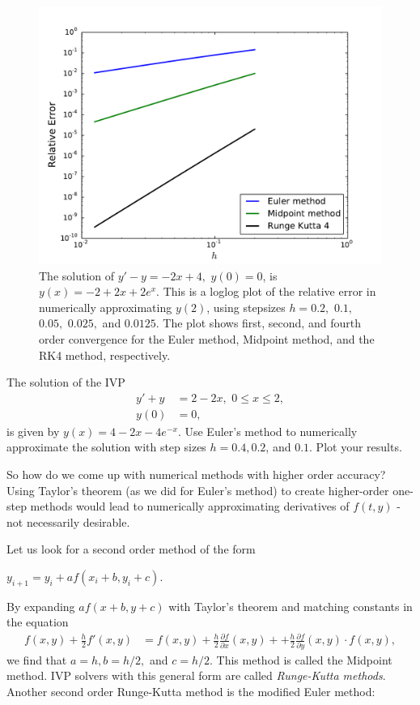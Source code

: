 \begin{figure}[ht]
\centering
\includegraphics[width=\textwidth]{Fig3.pdf}
\caption{The solution of $y' -y= -2x+4,$ $ y(0) = 0$, is $y(x) = -2+2x + 2e^x.$ This is a loglog plot of the relative error in numerically approximating $y(2)$, using stepsizes $h = 0.2,$ $0.1,$ $0.05,$ $0.025,$ and $0.0125$. The plot shows first, second, and fourth order convergence for the Euler method, Midpoint method, and the RK4 method, respectively.}
\label{ivp:relative_error}
\end{figure}


\begin{problem} The solution of the IVP
\begin{align*}
y' + y &= 2-2x,\,\, 0 \leq x \leq 2, \\
y(0) &= 0,
\end{align*}
is given by $y(x) = 4-2x -4e^{-x}$. 
Use Euler's method to numerically approximate the solution with step sizes $h = 0.4, 0.2$, and $0.1.$ Plot your results.
\end{problem}


So how do we come up with numerical methods with higher order accuracy? Using Taylor's theorem (as we did for Euler's method) to create higher-order one-step methods would lead to numerically approximating derivatives of $f(t,y)$ - not necessarily desirable. 

Let us look for a second order method of the form

$y_{i+1} = y_i + a f(x_i+b, y_i+c).$

By expanding $a f(x+b, y+c)$ with Taylor's theorem and matching constants in the equation
\begin{align*}
f(x,y) + \frac{h}{2}f'(x,y) &= f(x,y) + \frac{h}{2}\frac{\partial f}{\partial x}(x,y) +  + \frac{h}{2}\frac{\partial f}{\partial y}(x,y) \cdot f(x,y),
\end{align*}
we find that $a = h, b = h/2,$ and $c = h/2$. This method is called the Midpoint method. IVP solvers with this general form are called \textit{Runge-Kutta methods}. Another second order Runge-Kutta method is the modified Euler method: 

